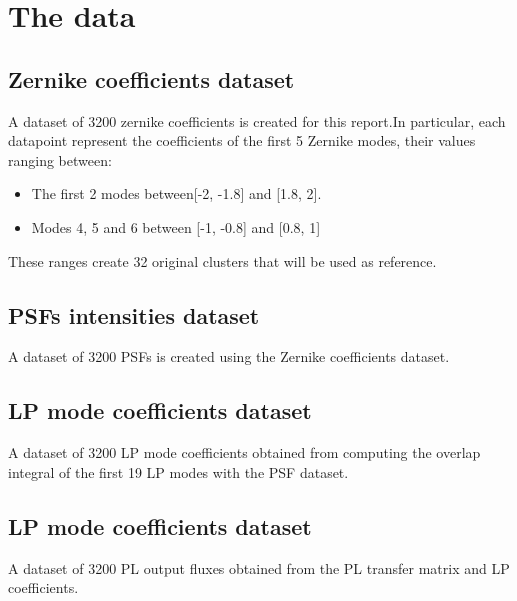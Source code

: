 \section{The data}

	\subsection{Zernike coefficients dataset}
			A dataset of 3200 zernike coefficients is created for this report.In particular, each datapoint represent the coefficients of the first 5 Zernike modes, their values ranging between:
			\begin{itemize}
				\item The first 2 modes between[-2, -1.8] and [1.8, 2].
				\item Modes 4, 5 and 6 between [-1, -0.8] and [0.8, 1]
			\end{itemize}			 
			These ranges create 32 original clusters that will be used as reference.
			
	\subsection{PSFs intensities dataset}
		
		A dataset of 3200 PSFs is created using the Zernike coefficients dataset.\\
		
	\subsection{LP mode coefficients dataset}
		A dataset of 3200 LP mode coefficients obtained from computing the overlap integral of the first 19 LP modes with the PSF dataset.
		
	\subsection{LP mode coefficients dataset}
		A dataset of 3200 PL output fluxes obtained from the PL transfer matrix and LP coefficients.
		